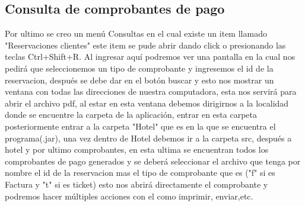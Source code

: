 \documentclass[12pt]{article}
\begin{document}
\begin{flushleft}
\section{Consulta de comprobantes de pago}
\textsf{Por ultimo se creo un menú Consultas en el cual existe un item llamado "Reservaciones clientes" este item se pude abrir dando click o presionando las teclas Ctrl+Shift+R. Al ingresar aquí podremos ver una pantalla en la cual nos pedirá que seleccionemos un tipo de comprobante y ingresemos el id de la reservacion, después se debe dar en el botón buscar y esto nos mostrar un ventana con todas  las direcciones de nuestra computadora, esta nos servirá para abrir el archivo pdf, al estar en esta ventana debemos dirigirnos a la localidad donde se encuentre la carpeta de la aplicación, entrar en esta carpeta posteriormente entrar a la carpeta "Hotel" que es en la que se encuentra el programa(.jar), una vez dentro de Hotel debemos ir a la carpeta src, después a hotel y por ultimo comprobantes, en esta ultima se encuentran todos los comprobantes de pago generados y se deberá seleccionar el archivo que tenga por nombre el id de la reservacion mas el tipo de comprobante que es ("f" si es Factura y "t" si es ticket) esto nos abrirá directamente el comprobante y podremos hacer múltiples acciones con el como imprimir, enviar,etc.}


\end{flushleft}
\end{document}
